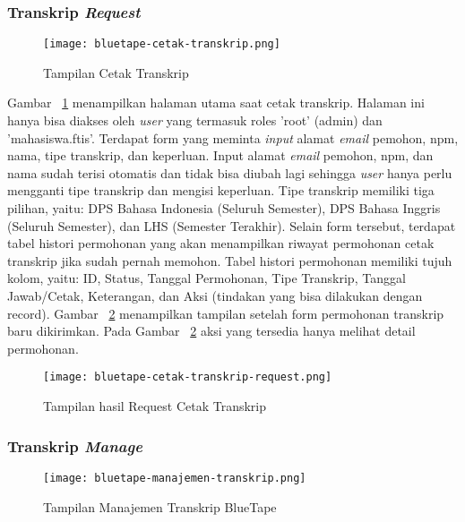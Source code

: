 	\subsubsection{Transkrip \textit{Request}} 
	\begin{figure}[H]
		\centering  
		\texttt{[image: bluetape-cetak-transkrip.png]}  
		\caption[Tampilan Cetak Transkrip]{Tampilan Cetak Transkrip} 
		\label{fig:bluetape-cetak-transkrip} 
	\end{figure}
	
	Gambar~ \ref{fig:bluetape-cetak-transkrip} menampilkan halaman utama saat cetak transkrip. Halaman ini hanya bisa diakses oleh \textit{user} yang termasuk roles 'root' (admin) dan 'mahasiswa.ftis'. Terdapat form yang meminta \textit{input} alamat \textit{email} pemohon, npm, nama, tipe transkrip, dan keperluan. Input alamat \textit{email} pemohon, npm, dan nama sudah terisi otomatis dan tidak bisa diubah lagi sehingga \textit{user} hanya perlu mengganti tipe transkrip dan mengisi keperluan. Tipe transkrip memiliki tiga pilihan, yaitu: DPS Bahasa Indonesia (Seluruh Semester), DPS Bahasa Inggris (Seluruh Semester), dan LHS (Semester Terakhir). Selain form tersebut, terdapat tabel histori permohonan yang akan menampilkan riwayat permohonan cetak transkrip jika sudah pernah memohon. Tabel histori permohonan memiliki tujuh kolom, yaitu: ID, Status, Tanggal Permohonan, Tipe Transkrip, Tanggal Jawab/Cetak, Keterangan, dan Aksi (tindakan yang bisa dilakukan dengan record). Gambar~ \ref{fig:bluetape-cetak-transkrip-request} menampilkan tampilan setelah form permohonan transkrip baru dikirimkan. Pada Gambar~ \ref{fig:bluetape-cetak-transkrip-request} aksi yang tersedia hanya melihat detail permohonan.

	\begin{figure}[H]
		\centering  
		\texttt{[image: bluetape-cetak-transkrip-request.png]}  
		\caption[Tampilan hasil Request Cetak Transkrip]{Tampilan hasil Request Cetak Transkrip} 
		\label{fig:bluetape-cetak-transkrip-request} 
	\end{figure}
	
	\subsubsection{Transkrip \textit{Manage}}
	\begin{figure}[H]
		\centering  
		\texttt{[image: bluetape-manajemen-transkrip.png]}  
		\caption[Tampilan Manajemen Transkrip BlueTape]{Tampilan Manajemen Transkrip BlueTape} 
		\label{fig:bluetape-manajemen-transkrip} 
	\end{figure}
	

